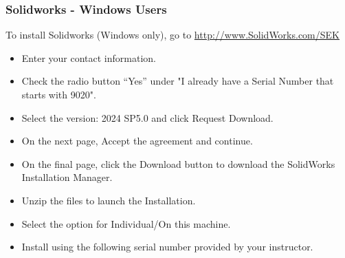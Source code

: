 \documentclass{beamer}
\begin{document}
\begin{frame}\frametitle{Solidworks - Windows Users}


To install Solidworks (Windows only), go to \url{http://www.SolidWorks.com/SEK}
\begin{itemize}
\item Enter your contact information.
\item Check the radio button “Yes” under "I already have a Serial Number that starts with 9020".
\item Select the version: 2024 SP5.0 and click Request Download.
\item On the next page, Accept the agreement and continue.
\item On the final page, click the Download button to download the SolidWorks Installation Manager.
\item Unzip the files to launch the Installation.
\item Select the option for Individual/On this machine.
\item Install using the following serial number provided by your instructor.
\end{itemize}



\end{frame}

\end{document}

